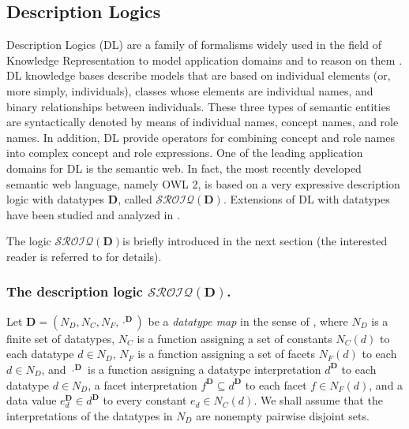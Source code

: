 \documentclass[a4paper]{llncs}
\newcommand{\sroiqd}{\ensuremath{\mathcal{SROIQ}(\D)}}
\newcommand{\D}{\mathbf{D}}
\newcommand{\vipcomment}[1]{}
\begin{document}
\subsection{Description Logics}
Description Logics (DL) are a family of formalisms widely used in the field of Knowledge Representation to model application domains and to reason on them \cite{Baader03descriptionlogics}.
DL knowledge bases describe models that are based on individual elements (or, more simply, individuals), classes whose elements are individual names, and binary relationships between individuals. These three types of semantic entities are syntactically denoted by means of individual names, concept names, and role names. In addition, DL provide operators for combining concept and role names into complex concept and role expressions.
One of the leading application domains for DL is the semantic web. In fact, the most recently developed semantic web language, namely OWL 2, is based on a very expressive description logic with datatypes $\D$, called \sroiqd. Extensions of DL with datatypes have been studied and analyzed in \cite{Horrocks:2001a, Motik2008}.

\vipcomment{Datatype reasoning can be performed using an external datatype checking procedure. Standard DL tableau calculi can then be extended to handle datatypes by invoking the datatype checker as an oracle.  In particular, in \cite{Motik2008} it is shown that datatype checking in OWL 2 is NP-hard in the general case, but may become trivial in many (hopefully typical) cases. \marginpar{La parte in rosso potrebbe essere rimossa.} The authors also argue that certain datatypes listed as normative in the current OWL 2 Working Draft may be unsuitable from both a modeling and implementation perspective. They also present a modular datatype checking algorithm that can support any datatype for which it is possible to implement a small set of basic operations that we call a datatype handler and discuss how to implement datatype handlers for number and string datatypes}

The logic \sroiqd\space is briefly introduced in the next section (the interested reader is referred to \cite{Horrocks2006} for details).


\subsubsection{The description logic \sroiqd.}\label{sroiqd}
Let $\D = (N_{D}, N_{C},N_{F},\cdot^{\D})$ be a \emph{datatype map} in the sense of \cite{Motik2008}, where  $N_{D}$ is a finite set of datatypes, $N_{C}$ is a function assigning a set of constants $N_{C}(d)$ to each datatype $d \in N_{D}$, $N_{F}$ is a function assigning a set of facets $N_{F}(d)$ to each $d \in N_{D}$, and $\cdot^{\D}$ is a function assigning a datatype interpretation $d^{\D}$ to each datatype $d \in N_{D}$, a facet interpretation $f^{\D} \subseteq d^{\D}$ to each facet $f \in N_{F}(d)$, and a data value $e_{d}^{\D} \in d^{\D}$ to every constant $e_{d} \in N_{C}(d)$.  We shall assume that the interpretations of the datatypes in $N_{D}$ are nonempty pairwise disjoint sets.
\end{document}

